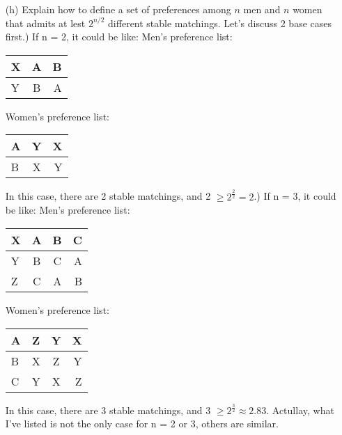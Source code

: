 \documentclass{article}       %
\begin{document}
\begin{enumerate}
\begin{enumerate}
                \item[(h)] Explain how to define a set of preferences among $n$ men and $n$ women that admits at lest $2^{n/2}$ different stable matchings.\newline
                Let's discuss 2 base cases first.) If n = 2, it could be like:\newline
                Men's preference list:
                \begin{tabular}{ | l | c | r | }
                	   \hline
                		X & A & B \\ \hline
                		Y & B & A \\ \hline
                \end{tabular}
               Women's preference list:
                \begin{tabular}{ | l | c | r | }
            	\hline
            	A & Y & X \\ \hline
            	B & X & Y \\ \hline
               \end{tabular}\newline
                In this case, there are 2 stable matchings, and 2 $\geq 2^{\frac{2}{2}} = 2$.) If n = 3, it could be like:\newline
                Men's preference list:
                \begin{tabular}{ | l | c | c | r | }
                	\hline
                	X & A & B & C\\ \hline
                	Y & B & C & A \\ \hline
                	Z & C & A & B \\ \hline
                \end{tabular}
               Women's preference list:
               \begin{tabular}{ | l | c | c | r | }
               	\hline
               	A & Z & Y & X\\ \hline
               	B & X & Z & Y \\ \hline
               	C & Y & X & Z \\ \hline
               \end{tabular} \newline
               In this case, there are 3 stable matchings, and 3 $\geq 2^{\frac{3}{2}} \approx 2.83$. \newline
               Actullay, what I've listed is not the only case for n = 2 or 3, others are similar.\newline

\end{enumerate}
\end{enumerate}
\end{document}
